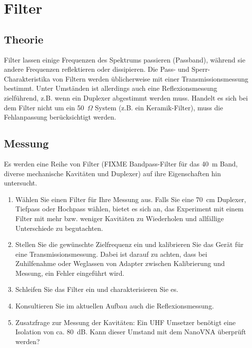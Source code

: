 \documentclass[twoside,a4paper,11pt,halfparskip,DIV=11,notitlepage]{scrartcl}
\begin{document}
\section{Filter}\label{sec:filter}

\subsection{Theorie}
Filter lassen einige Frequenzen des Spektrums passieren (Passband), während
sie andere Frequenzen reflektieren oder dissipieren. Die Pass- und Sperr-Charakteristika von Filtern werden üblicherweise mit einer
Transmissionsmessung bestimmt. Unter Umständen ist allerdings
auch eine Reflexionsmessung zielführend, z.B. wenn ein Duplexer abgestimmt
werden muss. Handelt es sich bei dem Filter nicht um ein 50~$\Omega$ System
(z.B. ein Keramik-Filter), muss die Fehlanpassung berücksichtigt werden.

\subsection{Messung}
Es werden eine Reihe von Filter (FIXME Bandpass-Filter für das 40~m Band,
diverse mechanische Kavitäten und Duplexer) auf ihre Eigenschaften hin
untersucht.

\begin{enumerate}
    \item Wählen Sie einen Filter für Ihre Messung aus. Falls Sie eine 70~cm
        Duplexer, Tiefpass oder Hochpass wählen, bietet es sich an, das Experiment
        mit einem Filter mit mehr bzw. weniger Kavitäten zu Wiederholen und
        allfällige Unterschiede zu begutachten.
    \item Stellen Sie die gewünschte Zielfrequenz ein und kalibrieren Sie das
        Gerät für eine Transmissionsmessung. Dabei ist darauf zu achten, dass
        bei Zuhilfenahme oder Weglassen von Adapter zwischen Kalibrierung und
        Messung, ein Fehler eingeführt wird.
    \item Schleifen Sie das Filter ein und charakterisieren Sie es.
    \item Konsultieren Sie im aktuellen Aufbau auch die Reflexionsmessung.
    \item Zusatzfrage zur Messung der Kavitäten: Ein UHF Umsetzer benötigt eine
        Isolation von ca. 80~dB. Kann dieser Umstand mit dem NanoVNA überprüft werden?


\end{enumerate}
\end{document}
